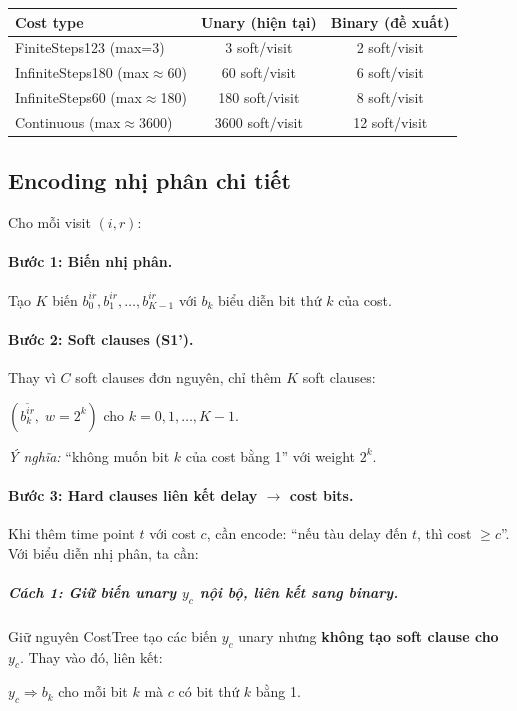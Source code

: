 \documentclass[11pt,a4paper]{article}
\begin{document}
\begin{center}
\begin{tabular}{lcc}
\toprule
\textbf{Cost type} & \textbf{Unary (hiện tại)} & \textbf{Binary (đề xuất)} \\
\midrule
FiniteSteps123 (max=3) & 3 soft/visit & 2 soft/visit \\
InfiniteSteps180 (max$\approx$60) & 60 soft/visit & 6 soft/visit \\
InfiniteSteps60 (max$\approx$180) & 180 soft/visit & 8 soft/visit \\
Continuous (max$\approx$3600) & 3600 soft/visit & 12 soft/visit \\
\bottomrule
\end{tabular}
\end{center}

\subsection{Encoding nhị phân chi tiết}

Cho mỗi visit $(i,r)$:

\paragraph{Bước 1: Biến nhị phân.} Tạo $K$ biến $b_0^{ir}, b_1^{ir}, \ldots, b_{K-1}^{ir}$ với $b_k$ biểu diễn bit thứ $k$ của cost.

\paragraph{Bước 2: Soft clauses (S1').} Thay vì $C$ soft clauses đơn nguyên, chỉ thêm $K$ soft clauses:
\begin{softbox}
$(\overline{b_k^{ir}}, \; w = 2^k)$ \quad cho $k = 0, 1, \ldots, K-1$.
\end{softbox}
\emph{Ý nghĩa:} ``không muốn bit $k$ của cost bằng 1'' với weight $2^k$.

\paragraph{Bước 3: Hard clauses liên kết delay $\to$ cost bits.} Khi thêm time point $t$ với cost $c$, cần encode: ``nếu tàu delay đến $t$, thì cost $\geq c$''. Với biểu diễn nhị phân, ta cần:

\subparagraph{Cách 1: Giữ biến unary $y_c$ nội bộ, liên kết sang binary.}

Giữ nguyên CostTree tạo các biến $y_c$ unary nhưng \textbf{không tạo soft clause cho $y_c$}. Thay vào đó, liên kết:
\begin{hardbox}
$y_c \Rightarrow b_k$ \quad cho mỗi bit $k$ mà $c$ có bit thứ $k$ bằng 1.
\end{hardbox}
\end{document}
